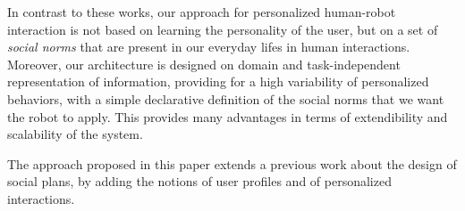 In contrast to these works, our approach for personalized human-robot
interaction is not based on learning the personality of the user, but
on a set of \textit{social norms} that are present in our everyday
lifes in human interactions.  Moreover, our architecture is designed on domain and task-independent representation of information, providing for a high variability of personalized behaviors, with a simple declarative definition of the social norms that we want the robot to apply. This provides many advantages in terms of extendibility and scalability of the system.

The approach proposed in this paper extends a previous work \cite{Nardi14} about the design of social plans, by adding the notions of user profiles and of personalized interactions.


